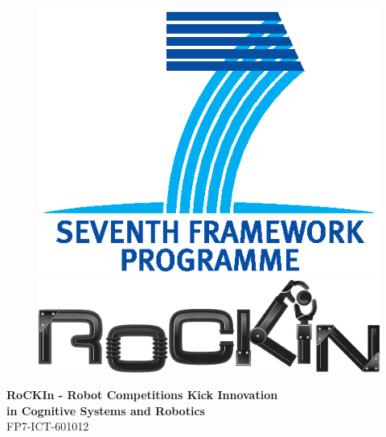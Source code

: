 
\thispagestyle{empty}


\begin{figure}
\begin{minipage}{.2\textwidth}  
  \flushright
  \vspace*{0.8cm}    
  \includegraphics[scale=0.4]{./fig/logos/FP7-gen-CMYK.eps}
\end{minipage}%
\begin{minipage}{.8\textwidth}
  \flushleft
  \hspace*{60pt}
  \includegraphics[scale=0.32]{./fig/logos/rockinLogo.eps}
\end{minipage}
\end{figure}

\begin{center}
 { \large \bfseries RoCKIn - Robot Competitions Kick Innovation}\\
 { \large \bfseries in Cognitive Systems and Robotics}\\
 { \large FP7-ICT-601012}\\
\end{center}

